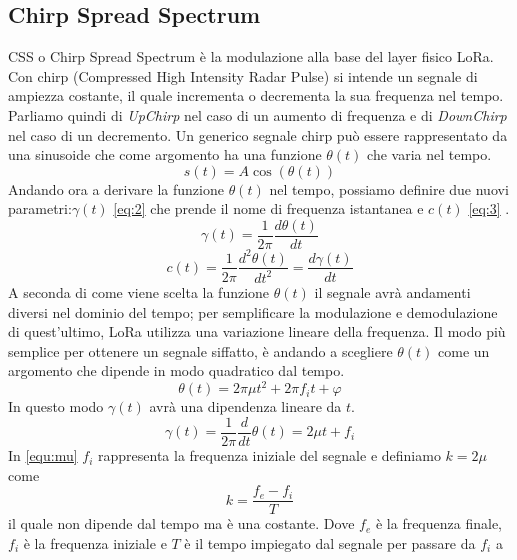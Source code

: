 \subsection{Chirp Spread Spectrum}
CSS o Chirp Spread Spectrum è la modulazione alla base del layer fisico LoRa. 
Con chirp (Compressed High Intensity Radar Pulse) si intende un segnale di
ampiezza costante, il quale incrementa o decrementa la sua frequenza nel tempo.
Parliamo quindi di \emph{UpChirp} nel caso di un aumento di frequenza e di
\emph{DownChirp} nel caso di un decremento.
Un generico segnale chirp può essere rappresentato da una sinusoide che come
argomento ha una funzione $\theta(t)$ che varia nel tempo.
\begin{equation}\label{eq:1}
        s(t) = A\cos(\theta (t))
\end{equation}
Andando ora a derivare la funzione  $\theta(t)$ nel tempo, possiamo  definire due
nuovi parametri:$\gamma(t)$ \ref{eq:2} che prende il nome di frequenza
istantanea e  $c(t)$ \ref{eq:3} .
\begin{equation}\label{eq:2}
        \gamma(t) = \frac{1}{2\pi} \frac{d\theta(t)}{dt}
\end{equation}
\begin{equation}\label{eq:3}
        c(t) = \frac{1}{2\pi}\frac{d^2\theta(t)}{dt^2} = \frac{d\gamma(t)}{dt}
\end{equation}
A seconda di come viene scelta la funzione $\theta(t)$ il segnale avrà
andamenti diversi nel dominio del tempo; per semplificare la modulazione e
demodulazione di quest'ultimo, LoRa utilizza una variazione lineare della frequenza.
Il modo più semplice per ottenere un segnale siffatto, è andando a scegliere $\theta(t)$
come un argomento che dipende in modo quadratico dal tempo.
\begin{equation}
        \theta(t) = 2\pi\mu t^2+2\pi f_it+\varphi
\end{equation}
In questo modo $\gamma(t)$ avrà una dipendenza lineare da $t$.
\begin{equation}\label{equ:mu}
        \gamma(t) = \frac{1}{2\pi}\frac{d}{dt}\theta(t)  = 2\mu t+ f_i
\end{equation}
In \ref{equ:mu} $f_i$ rappresenta la frequenza iniziale del segnale e definiamo
$k = 2\mu$ come 
\begin{equation}\label{equ:chirpizzazione}
        k =  \frac{f_e-f_i}{T}
\end{equation}
il quale non dipende dal tempo ma è una costante.  Dove $f_e$ è la frequenza finale, $f_i$ è la
frequenza iniziale e $T$ è il tempo impiegato dal segnale per passare da $f_i$ a
